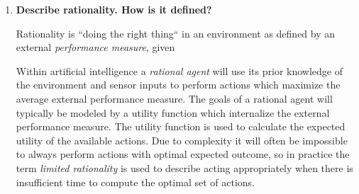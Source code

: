 \begin{enumerate}
Further, the truth of each atomic sentence can be defined in terms of \textit{reference} and \textit{satisfation}. If the language \textbf{L} is now set to contain the two terms ``snow'' and ``grass'', and the predicates ``is white'' and ``is green''; then truth for atomic sentences can be defined as follows:

\begin{enumerate}
\item Base clauses:
\begin{itemize}
\item Term: $\Quinequote{\text{\eenskip{}Snow}}$ refers to snow.
\item Term: $\Quinequote{\text{\eenskip{}Grass}}$ refers to grass.
\item Predicate: $a$ satisfies $\Quinequote{\text{\eenskip{}is white}}$ if and only if $a$ is white.
\item Predicate: $a$ satisfies $\Quinequote{\text{\eenskip{}is green}}$ if and only if $a$ is green.
\end{itemize}
\item An atomic sentence  is true if and only if the referent of $\Quinequote{T}$ satisfies $\Quinequote{P}$.
\end{enumerate}

This shows an example of how objects in the real world can be referenced from within formal languages and how Tarski's theory can be used to evaluate the truth of such sentences.

\textit{References: http://plato.stanford.edu/entries/truth/}

\item \textbf{Describe rationality. How is it defined?}\nopagebreak

Rationality is ``doing the right thing`` in an environment as defined by an external \textit{performance measure}, given

Within artificial intelligence a \textit{rational agent} will use its prior knowledge of the environment and sensor inputs to perform actions which maximize the average external performance measure. The goals of a rational agent will typically be modeled by a utility function which internalize the external performance measure. The utility function is used to calculate the expected utility of the available actions. Due to complexity it will often be impossible to always perform actions with optimal expected outcome, so in practice the term \textit{limited rationality} is used to describe acting appropriately when there is insufficient time to compute the optimal set of actions.


\end{enumerate}
